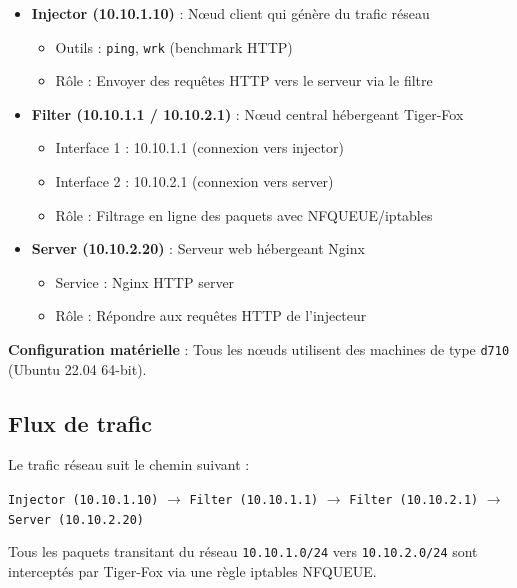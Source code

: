 \documentclass[12pt,a4paper]{article}
\begin{document}
\begin{itemize}
    \item \textbf{Injector (10.10.1.10)} : Nœud client qui génère du trafic réseau
    \begin{itemize}
        \item Outils : \texttt{ping}, \texttt{wrk} (benchmark HTTP)
        \item Rôle : Envoyer des requêtes HTTP vers le serveur via le filtre
    \end{itemize}
    
    \item \textbf{Filter (10.10.1.1 / 10.10.2.1)} : Nœud central hébergeant Tiger-Fox
    \begin{itemize}
        \item Interface 1 : 10.10.1.1 (connexion vers injector)
        \item Interface 2 : 10.10.2.1 (connexion vers server)
        \item Rôle : Filtrage en ligne des paquets avec NFQUEUE/iptables
    \end{itemize}
    
    \item \textbf{Server (10.10.2.20)} : Serveur web hébergeant Nginx
    \begin{itemize}
        \item Service : Nginx HTTP server
        \item Rôle : Répondre aux requêtes HTTP de l'injecteur
    \end{itemize}
\end{itemize}

\textbf{Configuration matérielle} : Tous les nœuds utilisent des machines de type \texttt{d710} (Ubuntu 22.04 64-bit).

\subsection{Flux de trafic}

Le trafic réseau suit le chemin suivant :

\begin{center}
\texttt{Injector (10.10.1.10)} $\rightarrow$ \texttt{Filter (10.10.1.1)} $\rightarrow$ \texttt{Filter (10.10.2.1)} $\rightarrow$ \texttt{Server (10.10.2.20)}
\end{center}

Tous les paquets transitant du réseau \texttt{10.10.1.0/24} vers \texttt{10.10.2.0/24} sont interceptés par Tiger-Fox via une règle iptables NFQUEUE.
\end{document}
